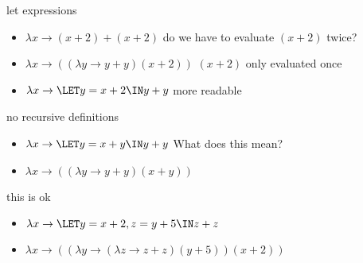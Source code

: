 \begin{frame}{let expressions}
  \begin{itemize}  
   \pause \item $\lambda x \rightarrow  (x + 2) +  (x + 2)$ \pause \hspace{20pt} do we have to evaluate $(x+2)$ twice?
   \pause \item $\lambda x \rightarrow  ((\lambda y \rightarrow y + y) (x + 2))$  \pause  \hspace{20pt} $(x+2)$ only evaluated once
   \pause \item $\lambda x \rightarrow  \LET y = x + 2 \IN y + y $  \pause  \hspace{20pt} more readable 
  \end{itemize}
\end{frame}

\begin{frame}{no recursive definitions}
  \begin{itemize}  
   \pause \item $\lambda x \rightarrow  \LET y = x + y \IN y + y $ \pause \hspace{20pt} What does this mean?
   \pause \item $\lambda x \rightarrow  ((\lambda y \rightarrow y + y) (x + y))$  
  \end{itemize}
\end{frame}

\begin{frame}{this is ok}
  \begin{itemize}  
   \pause \item $\lambda x \rightarrow  \LET y = x + 2 , z = y + 5 \IN z + z $
   \pause \item $\lambda x \rightarrow  ((\lambda y \rightarrow (\lambda z \rightarrow z + z)(y + 5)) (x + 2))$  
  \end{itemize}
\end{frame}


